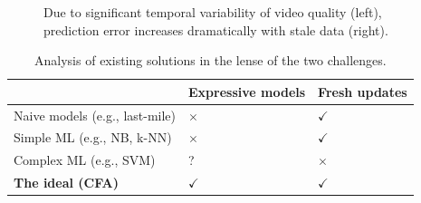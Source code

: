 \begin{figure}[t!]
\centering
{}
\caption{Due to significant temporal variability of video quality (left), 
prediction error increases dramatically with stale data (right).}
\label{fig:temporal-variability}
\end{figure}




{
\begin{table}[h!]
\begin{tabular}{p{6cm}|p{3.5cm}|p{3cm}}
   &\textbf{Expressive models} & \textbf{Fresh updates} \\ \hline
Naive models (e.g., last-mile)                       & $\times$          & $\checkmark$         \\ \hline
Simple ML (e.g., NB, k-NN)                       & $\times$          & $\checkmark$         \\ \hline
Complex ML (e.g., SVM)	                            & ?                 & $\times$             \\ \hline 
{\bf The ideal (CFA)}                                 & {\bf $\checkmark$} & {\bf $\checkmark$}
\end{tabular}
\caption{Analysis of existing solutions in the lense of the two challenges.}
\label{tab:qualitative-strawmen}
\end{table}
}












